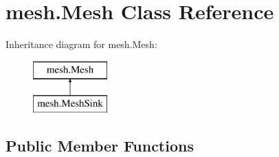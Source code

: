 \hypertarget{classmesh_1_1Mesh}{}\section{mesh.\+Mesh Class Reference}
\label{classmesh_1_1Mesh}
Inheritance diagram for mesh.\+Mesh\+:\begin{figure}[H]
\begin{center}
\leavevmode
\includegraphics[height=2.000000cm]{classmesh_1_1Mesh}
\end{center}
\end{figure}
\subsection*{Public Member Functions}
